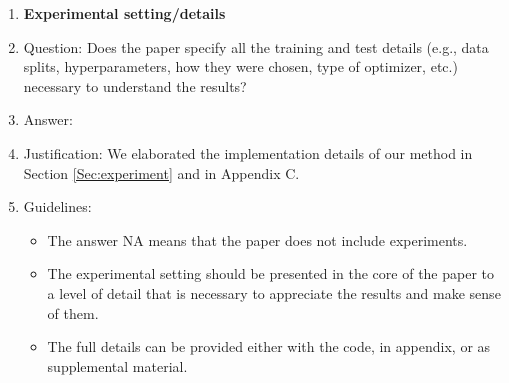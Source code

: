 \documentclass{article}
\begin{document}
\begin{enumerate}
\item {\bf Experimental setting/details}
    \item[] Question: Does the paper specify all the training and test details (e.g., data splits, hyperparameters, how they were chosen, type of optimizer, etc.) necessary to understand the results?
    \item[] Answer: \answerYes{} %
    \item[] Justification: We elaborated the implementation details of our method in Section \ref{Sec:experiment} and in Appendix C.
    \item[] Guidelines:
    \begin{itemize}
        \item The answer NA means that the paper does not include experiments.
        \item The experimental setting should be presented in the core of the paper to a level of detail that is necessary to appreciate the results and make sense of them.
        \item The full details can be provided either with the code, in appendix, or as supplemental material.
    \end{itemize}


\end{enumerate}
\end{document}
